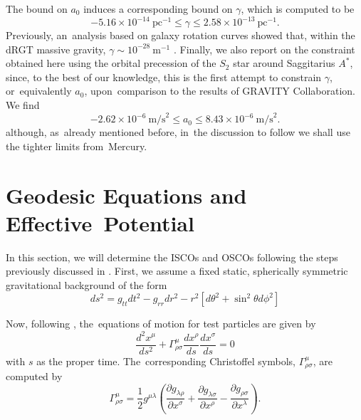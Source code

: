 \documentclass[aps,amsmath,amssymb,twocolumn]{revtex4}
\begin{document}
The bound on $a_0$ induces a corresponding bound on $\gamma$, which is computed to be
\begin{equation}
-5.16 \times 10^{-14} \ \text{pc}^{-1} \leq \gamma \leq  2.58 \times 10^{-13} \ \text{pc}^{-1}.
\end{equation}
%
Previously, an~analysis based on galaxy rotation curves showed that, within the dRGT massive gravity, $\gamma \sim 10^{-28}~\text{m}^{-1}$ \cite{Panpanich:2018cxo}.
%
Finally, we also report on the constraint obtained here using the orbital precession of the $S_2$ star around Saggitarius $A^*$, since, to the best of our knowledge, this is the first attempt to constrain $\gamma$, or~equivalently $a_0$, upon~comparison to the results of GRAVITY Collaboration. We find
%
\begin{equation}
-2.62 \times 10^{-6} ~\text{m/s}^2 \leq a_0 \leq  8.43 \times 10^{-6} ~\text{m/s}^2.
\end{equation}
%
although, as~already mentioned before, in~the discussion to follow we shall use the tighter limits from~Mercury.



\section{Geodesic Equations and Effective~Potential\label{sec4}}


In this section, we will determine the ISCOs and OSCOs following the steps previously discussed in \cite{Boonserm:2019nqq}. First, we assume a fixed static, spherically symmetric gravitational background of the form
%
\begin{equation}
ds^2 = g_{tt} dt^2 - g_{rr} dr^2 - r^2 [ d \theta^2 + \sin^2\theta d \phi^2 ]
\end{equation}
 
Now, following  \cite{Garcia:2013zud}, the~equations of motion for test particles are given by 
%
\begin{equation}
\frac{d^2x^\mu}{ds^2} + \Gamma^\mu_{\rho \sigma} \frac{dx^\rho}{ds} \frac{dx^\sigma}{ds} = 0
\end{equation}
%
with $s$ as the proper time. The~corresponding Christoffel symbols, $\Gamma^\mu_{\rho \sigma}$, are computed by~\cite{landau}
%
\begin{equation}
\Gamma^\mu_{\rho \sigma} = \frac{1}{2} g^{\mu \lambda} \left( \frac{\partial g_{\lambda \rho}}{\partial x^\sigma} + \frac{\partial g_{\lambda \sigma}}{\partial x^\rho} - \frac{\partial g_{\rho \sigma}}{\partial x^\lambda} \right).
\end{equation}
 
\end{document}
